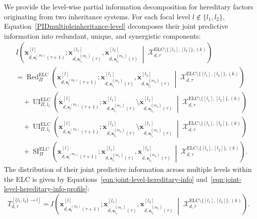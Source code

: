 \documentclass[11pt]{article}
\begin{document}
We provide the level-wise partial information decomposition for hereditary factors originating from two inheritance systems. For each focal level $l\notin\{l_1,l_2\}$, Equation~\ref{PIDmultipleinheritance-level} decomposes their joint predictive information into redundant, unique, and synergistic components:
\begin{align}
\label{PIDmultipleinheritance-level}
&
I\left(
\mathbf{x}^{[l]}_{d,\mathbf{s}^{(m_l)}_l(\tau+1)};
\mathbf{x}^{[l_1]}_{d,\mathbf{s}^{(m_{l_1})}_{l_1}(\tau)},
\mathbf{x}^{[l_2]}_{d,\mathbf{s}^{(m_{l_2})}_{l_2}(\tau)}
\;\middle|\;
\mathcal{X}^{\mathrm{ELC}\setminus\{[l_1],[l_2]\},(k)}_{d,\tau}
\right)
\nonumber\\
&=
\operatorname{Red}^{\mathrm{ELC}}_{\Pi}
\left(
\mathbf{x}^{[l]}_{d,\mathbf{s}^{(m_l)}_l(\tau+1)};
\mathbf{x}^{[l_1]}_{d,\mathbf{s}^{(m_{l_1})}_{l_1}(\tau)},
\mathbf{x}^{[l_2]}_{d,\mathbf{s}^{(m_{l_2})}_{l_2}(\tau)}
\;\middle|\;
\mathcal{X}^{\mathrm{ELC}\setminus\{[l_1],[l_2]\},(k)}_{d,\tau}
\right)
\nonumber\\
&\quad+
\operatorname{UI}^{\mathrm{ELC}}_{\Pi,l_1}
\left(
\mathbf{x}^{[l]}_{d,\mathbf{s}^{(m_l)}_l(\tau+1)};
\mathbf{x}^{[l_1]}_{d,\mathbf{s}^{(m_{l_1})}_{l_1}(\tau)}
\setminus
\mathbf{x}^{[l_2]}_{d,\mathbf{s}^{(m_{l_2})}_{l_2}(\tau)}
\;\middle|\;
\mathcal{X}^{\mathrm{ELC}\setminus\{[l_1],[l_2]\},(k)}_{d,\tau}
\right)
\nonumber\\
&\quad+
\operatorname{UI}^{\mathrm{ELC}}_{\Pi,l_2}
\left(
\mathbf{x}^{[l]}_{d,\mathbf{s}^{(m_l)}_l(\tau+1)};
\mathbf{x}^{[l_2]}_{d,\mathbf{s}^{(m_{l_2})}_{l_2}(\tau)}
\setminus
\mathbf{x}^{[l_1]}_{d,\mathbf{s}^{(m_{l_1})}_{l_1}(\tau)}
\;\middle|\;
\mathcal{X}^{\mathrm{ELC}\setminus\{[l_1],[l_2]\},(k)}_{d,\tau}
\right)
\nonumber\\
&\quad+
\operatorname{SI}^{\mathrm{ELC}}_{\Pi}
\left(
\mathbf{x}^{[l]}_{d,\mathbf{s}^{(m_l)}_l(\tau+1)};
\mathbf{x}^{[l_1]}_{d,\mathbf{s}^{(m_{l_1})}_{l_1}(\tau)},
\mathbf{x}^{[l_2]}_{d,\mathbf{s}^{(m_{l_2})}_{l_2}(\tau)}
\;\middle|\;
\mathcal{X}^{\mathrm{ELC}\setminus\{[l_1],[l_2]\},(k)}_{d,\tau}
\right).
\end{align}
The distribution of their joint predictive information across multiple levels within the ELC is given by Equations~\ref{eqn:joint-level-hereditary-info} and~\ref{eqn:joint-level-hereditary-info-profile}:
\begin{equation}
\label{eqn:joint-level-hereditary-info}
T^{[\{l_1,l_2\} \to l]}_{d,\tau}
=
I\left(
\mathbf{x}^{[l]}_{d,\mathbf{s}^{(m_l)}_l(\tau+1)};
\mathbf{x}^{[l_1]}_{d,\mathbf{s}^{(m_{l_1})}_{l_1}(\tau)},
\mathbf{x}^{[l_2]}_{d,\mathbf{s}^{(m_{l_2})}_{l_2}(\tau)}
\;\middle|\;
\mathcal{X}^{\mathrm{ELC}\setminus\{[l_1],[l_2]\},(k)}_{d,\tau}
\right).
\end{equation}
\end{document}
